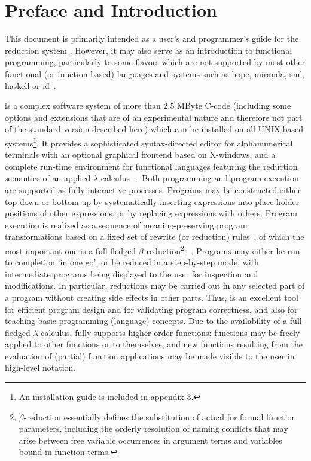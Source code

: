 \section{Preface and Introduction}

This document is primarily intended as a user's and programmer's guide 
for the reduction system \pired.
However, it may also serve
as an introduction to {\mys functional programming}, particularly
to some flavors which are not supported by most other {\mys functional}
(or function-based) {\mys languages} and
systems such as {\sc hope, miranda, sml, haskell} or {\sc id}~\cite{burs80,turn85a,turn86,harp86,harp88a,huda88,nikh88}. 

\pired is a complex software system of more than 2.5 MByte C-code (including some options and extensions that are of an experimental nature and therefore not part of the standard version described here) which can be
installed on all UNIX-based systems\footnote{An installation guide is included in appendix 3.}. It provides a sophisticated
{\mys syntax-directed editor} for alphanumerical terminals with an
optional graphical frontend based on X-windows, and a complete run-time environment
 for functional
 languages featuring the {\mys reduction semantics} of an applied
{\mys $\lambda$-calculus} ~\cite{chur41,bar81,hind86}. Both programming and program execution are
supported as fully interactive processes. Programs may be constructed either
top-down or bottom-up by systematically inserting expressions
into place-holder positions of other expressions, or by replacing
expressions with others. Program execution is realized as a sequence of
{\mys meaning-preserving} program {\mys transformations} based on a fixed set of
{\mys rewrite} (or {\mys reduction}) {\mys rules}~, of which 
the most important one is a 
full-fledged {\mys $\beta$-reduction}\footnote{$\beta$-reduction 
essentially defines the substitution of actual for formal function
 parameters, including the orderly resolution of {\mys naming conflicts}
that may arise between free variable occurrences in argument terms
and variables bound in function terms.}
~\cite{berk75,berk82b}. Programs  may either be run to completion `in
one go', or be reduced
in a step-by-step mode, with intermediate programs being displayed to the user for
inspection and modifications. In particular, reductions
may be carried out in any selected part of a program without creating
side effects in other parts. Thus, \pired is
 an excellent
tool for efficient program design and for validating program correctness, and also for teaching basic programming (language) concepts.
Due to the availability of a full-fledged $\lambda$-calculus, \pired
fully supports {\mys higher-order functions}: functions may be 
freely applied to other functions or to themselves, and
new functions resulting from the evaluation of (partial) function applications 
may be made visible to the user in high-level notation.

